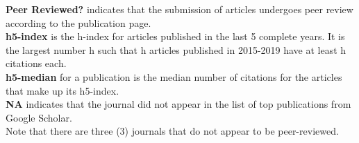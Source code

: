 {\bf Peer Reviewed?} indicates that the submission of articles undergoes peer review according to the publication page. \\

{\bf h5-index} is the h-index for articles published in the last 5 complete years. It is the largest number h such that h articles published in 2015-2019 have at least h citations each. \\

{\bf h5-median} for a publication is the median number of citations for the articles that make up its h5-index. \\

{\bf NA} indicates that the journal did not appear in the list of top publications from Google Scholar.\\

Note that there are three (3) journals that do not appear to be peer-reviewed. \\

